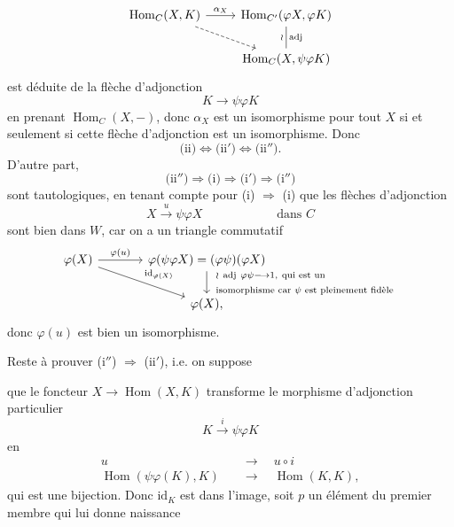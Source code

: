 \documentclass[11pt]{article}
\newcommand{\printedpage}[1]{\marginpar{\footnotesize p.~#1}}
\newcommand{\msp}[1]{\marginpar{\footnotesize [#1]}}
\newcommand{\Hom}{\operatorname{Hom}}
\newcommand{\id}{\mathrm{id}}
\begin{document}
\printedpage{24}

\[
\begin{tikzcd}
\Hom_C(X,K) \arrow[r,"\alpha_X"] \arrow[dr,dashed] & \Hom_{C'}(\varphi X,\varphi K) \arrow[d,dash,"\wr"',"\mathrm{adj}"] \\
 & \Hom_C(X,\psi\varphi K)
\end{tikzcd}
\]
est déduite de la flèche d'adjonction
\[
K \longrightarrow \psi\varphi K
\]
en prenant $\Hom_C(X,-)$, donc $\alpha_X$ est un isomorphisme pour tout $X$ si et seulement si cette flèche d'adjonction est un isomorphisme. Donc
\[
\text{(ii)} \Longleftrightarrow \text{(ii$'$)} \Longleftrightarrow \text{(ii$''$)}.
\]
D'autre part,
\[
\text{(ii$''$)} \Longrightarrow \text{(i)} \Longrightarrow \text{(i$'$)} \Longrightarrow \text{(i$''$)}
\]
sont tautologiques, en tenant compte pour (i) $\Longrightarrow$ (i) que les flèches d'adjonction
\[
X \xrightarrow{u} \psi\varphi X \qquad\qquad\qquad \text{dans } C
\]
sont bien dans $W$, car on a un triangle commutatif
\[
\begin{tikzcd}[column sep=large]
\varphi(X) \arrow[r,"\varphi(u)"] \arrow[dr,"\id_{\varphi(X)}"] & \varphi(\psi\varphi X) = (\varphi\psi)(\varphi X) \arrow[d,"{\begin{array}{l}\wr\ \mathrm{adj}\ \varphi\psi \longrightarrow 1,\ \text{qui est un}\\ \text{isomorphisme car } \psi \text{ est pleinement fidèle}\end{array}}"] \\
 & \varphi(X),
\end{tikzcd}
\]
donc $\varphi(u)$ est bien un isomorphisme.

Reste à prouver (i$''$) $\Longrightarrow$ (ii$'$), i.e. on suppose

\noindent\msp{page 39}%
que le foncteur $X \longrightarrow \Hom(X,K)$ transforme le morphisme d'adjonction particulier
\[
K \xrightarrow{i} \psi\varphi K
\]
en
\[
\begin{aligned}
u \quad &\longrightarrow \quad u\circ i\\
\Hom(\psi\varphi(K),K) \quad &\longrightarrow \quad \Hom(K,K),
\end{aligned}
\]
qui est une bijection. Donc $\id_K$ est dans l'image, soit $p$ un élément du premier membre qui lui donne naissance

\printedpage{25}
\end{document}
